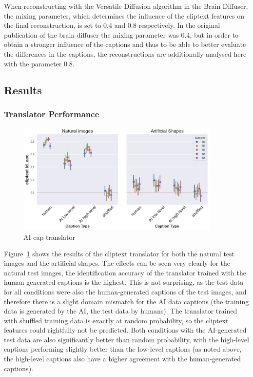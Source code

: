 When reconstructing with the Versatile Diffusion algorithm in the Brain Diffuser, the mixing parameter, which determines the influence of the cliptext features on the final reconstruction, is set to 0.4 and 0.8 respectively. In the original publication of the brain-diffuser\cite{ozcelikNaturalSceneReconstruction2023} the mixing parameter was 0.4, but in order to obtain a stronger influence of the captions and thus to be able to better evaluate the differences in the captions, the reconstructions are additionally analysed here with the parameter 0.8.


\subsection{Results}

\subsubsection{Translator Performance}

\begin{figure}[ht]
    \centering
    \includegraphics[width=0.9\textwidth]{plots/aicap_translator.png}
    \caption{AI-cap translator}\label{fig:aicap_translator}
\end{figure}

Figure~\ref{fig:aicap_translator} shows the results of the cliptext translator for both the natural test images and the artificial shapes. The effects can be seen very clearly for the natural test images, the identification accuracy of the translator trained with the human-generated captions is the highest. This is not surprising, as the test data for all conditions were also the human-generated captions of the test images, and therefore there is a slight domain mismatch for the AI data captions (the training data is generated by the AI, the test data by humans). The translator trained with shuffled training data is exactly at random probability, so the cliptext features could rightfully not be predicted. Both conditions with the AI-generated test data are also significantly better than random probability, with the high-level captions performing slightly better than the low-level captions (as noted above, the high-level captions also have a higher agreement with the human-generated captions). 


